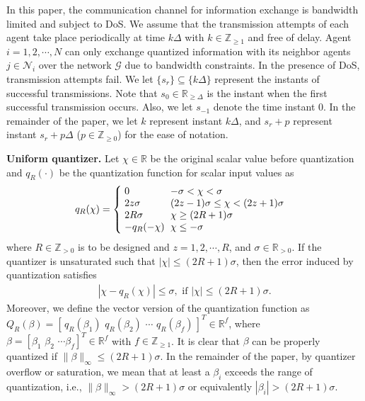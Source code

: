 \documentclass[letterpaper,journal,final,twocolumn]{IEEEtran}
\begin{document}
In this paper, the communication channel for information exchange is bandwidth limited and subject to DoS. 
We assume that the transmission attempts of each agent take place periodically at time $k\Delta$ with $k\in \mathbb{Z}_{\ge 1}$ and free of delay. 
Agent $i = 1, 2, \cdots, N$ can only exchange quantized information with its neighbor agents $j \in \mathcal N_i$ over the network $\mathcal G$ due to bandwidth constraints. In the presence of DoS, transmission attempts fail. We let $\{s_r\} \subseteq \{k\Delta\}$ represent the instants of successful transmissions. Note that $s_0 \in \mathbb{R}_{\ge \Delta}$ is the instant when the first successful transmission occurs. Also, we let $s_{-1}$ denote the time instant $0$. 
In the remainder of the paper, we 
let $k$ represent instant $k\Delta$, and $s_r + p$ represent instant $s_r + p\Delta$ ($p \in \mathbb Z _{\ge 0}$) for the ease of notation.




\textbf{Uniform quantizer.} Let $\chi \in \mathbb{R}$ be the original scalar value before quantization and $q_R(\cdot)$ be the quantization function for scalar
input values as
\begin{align}\setlength{\arraycolsep}{3pt}  \label{quantizer}
q_R (\chi) = 
\left\{
\begin{array}{lll}
0 & -\sigma < \chi < \sigma & \\
2z \sigma & (2z-1)\sigma \le \chi < (2z+1)\sigma  \\
2R\sigma & \chi \ge  (2R+1) \sigma&         \\
-q_R (-\chi) & \chi \le - \sigma & 
\end{array}
\right.
\end{align}
where $R\in \mathbb{Z}_{>0}$ is to be designed and $z =1, 2, \cdots, R$, and $\sigma \in \mathbb{R}_{>0}$. If the quantizer is unsaturated such that $|\chi| \le (2R+1)\sigma $, then the error induced by quantization satisfies 
\begin{align}\label{quantizer error}
|\chi - q_R(\chi)| \le \sigma, \,\, \text{if}\,\, |\chi| \le (2R+1)\sigma.
\end{align}
 Moreover, we define the vector version of the quantization function as $Q_R(\beta) = [\,q_R(\beta_1)\,\,q_R(\beta_2)\,\, \cdots \,\, q_R(\beta_f) \, ]^T \in \mathbb R ^f$, where $\beta = [\beta_1\,\, \beta_ 2\,\, \cdots \beta_f]^ T \in \mathbb R ^f$ with $f \in \mathbb Z_{\ge 1} $. 
 It is clear that $\beta$ can be properly quantized if $\|\beta\|_\infty \le (2R+1)\sigma$.  
In the remainder of the paper, by quantizer overflow or saturation, we mean that at least a $\beta_i$ exceeds the range of quantization, i.e., $\|\beta\|_\infty > (2R+1)\sigma$ or equivalently $|\beta_i | > (2R+1)\sigma$. 
\end{document}
